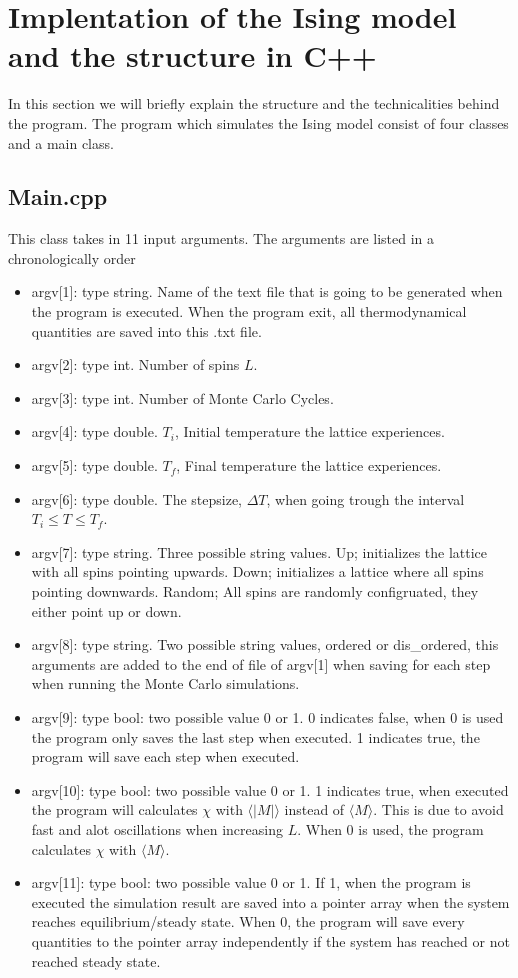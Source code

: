\documentclass[a4paper, 10pt]{article}
\begin{document}
\section{Implentation of the Ising model and the structure in C++}
In this section we will briefly explain the structure and the technicalities behind the program.
The program which simulates the Ising model consist of four classes and a main class.
\subsection{Main.cpp}
This class takes in 11 input arguments. The arguments are listed in a chronologically order
\begin{itemize}
  \item argv[1]: type string. Name of the text file that is going to be generated when the program is executed. When the program exit,
  all thermodynamical quantities are saved into this .txt file.
  \item argv[2]: type int. Number of spins $L$.
  \item argv[3]: type int. Number of Monte Carlo Cycles.
  \item argv[4]: type double. $T_{i}$, Initial temperature the lattice experiences.
  \item argv[5]: type double.  $T_{f}$, Final temperature the lattice experiences.
  \item argv[6]: type double. The stepsize, $\Delta T$, when going trough the interval
  $T_{i} \le T \le T_{f}$.
    \item argv[7]: type string. Three possible string values. Up; initializes the lattice with all spins pointing upwards.
    Down; initializes a lattice where all spins pointing downwards. Random; All spins are randomly configruated, they either point up or down.
      \item argv[8]: type string. Two possible string values, ordered or dis\_ordered, this arguments are added to the end of file of argv[1]
      when saving for each step when running the Monte Carlo simulations.
        \item argv[9]: type bool: two possible value 0 or 1. 0 indicates false, when 0 is used the program only saves the last step when executed.
        1 indicates true, the program will save each step when executed.
          \item argv[10]: type bool:  two possible value 0 or 1. 1 indicates true, when executed the program will calculates $\chi$ with
          $\langle |M|\rangle$ instead of $\langle M \rangle$. This is due to avoid fast and alot oscillations when increasing $L$. When 0 is used, the program calculates
          $\chi$ with $\langle M \rangle$.
          \item argv[11]: type bool: two possible value 0 or 1. If 1, when the program is executed the simulation result are saved into a pointer array when the system reaches equilibrium/steady state.
          When 0, the program will save every quantities to the pointer array independently if the system has reached or not reached steady state.
\end{itemize}
\end{document}
